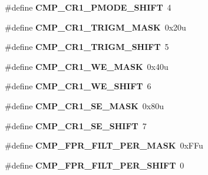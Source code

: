 \begin{DoxyCompactItemize}
\item 
\mbox{\label{group___c_m_p___register___masks_ga35cfe45cce5ed6925e522e3c4527054a}} 
\#define {\bfseries C\+M\+P\+\_\+\+C\+R1\+\_\+\+P\+M\+O\+D\+E\+\_\+\+S\+H\+I\+FT}~4
\item 
\mbox{\label{group___c_m_p___register___masks_ga24b34c51bad9a20f0b0d47b89fdd864b}} 
\#define {\bfseries C\+M\+P\+\_\+\+C\+R1\+\_\+\+T\+R\+I\+G\+M\+\_\+\+M\+A\+SK}~0x20u
\item 
\mbox{\label{group___c_m_p___register___masks_ga699c1c25ea54f378c1e6eece319bbca3}} 
\#define {\bfseries C\+M\+P\+\_\+\+C\+R1\+\_\+\+T\+R\+I\+G\+M\+\_\+\+S\+H\+I\+FT}~5
\item 
\mbox{\label{group___c_m_p___register___masks_ga70bc3069a7e105b59d01d83b4d1714b1}} 
\#define {\bfseries C\+M\+P\+\_\+\+C\+R1\+\_\+\+W\+E\+\_\+\+M\+A\+SK}~0x40u
\item 
\mbox{\label{group___c_m_p___register___masks_ga386bf7ca4f7eb8faa4ba8346620667f2}} 
\#define {\bfseries C\+M\+P\+\_\+\+C\+R1\+\_\+\+W\+E\+\_\+\+S\+H\+I\+FT}~6
\item 
\mbox{\label{group___c_m_p___register___masks_ga899d139651dd67746e73452ff19e892b}} 
\#define {\bfseries C\+M\+P\+\_\+\+C\+R1\+\_\+\+S\+E\+\_\+\+M\+A\+SK}~0x80u
\item 
\mbox{\label{group___c_m_p___register___masks_ga57cd3f81d8844d4e0509f342ae5170bb}} 
\#define {\bfseries C\+M\+P\+\_\+\+C\+R1\+\_\+\+S\+E\+\_\+\+S\+H\+I\+FT}~7
\item 
\mbox{\label{group___c_m_p___register___masks_gaf8ca758656c156ecadfbb6f9e57a3eef}} 
\#define {\bfseries C\+M\+P\+\_\+\+F\+P\+R\+\_\+\+F\+I\+L\+T\+\_\+\+P\+E\+R\+\_\+\+M\+A\+SK}~0x\+F\+Fu
\item 
\mbox{\label{group___c_m_p___register___masks_gaa563be7a82c0c1e3802e7ac7c920bf3a}} 
\#define {\bfseries C\+M\+P\+\_\+\+F\+P\+R\+\_\+\+F\+I\+L\+T\+\_\+\+P\+E\+R\+\_\+\+S\+H\+I\+FT}~0

\end{DoxyCompactItemize}
